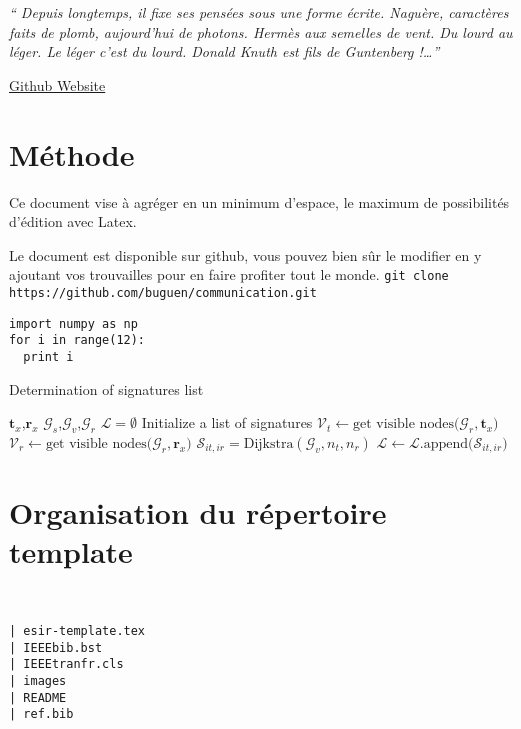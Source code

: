 \documentclass[twocolumn,a4paper]{IEEEtranfr}
\newcommand{\mc}[1]{\mathcal{#1}}
\begin{document}
{\textit
{`` Depuis longtemps, il fixe ses pensées sous une forme écrite.
Naguère, caractères faits de plomb, aujourd'hui de photons. Hermès aux semelles de vent. Du lourd au léger. Le léger c'est du lourd. 
Donald Knuth est fils de Guntenberg !\dots''}

\href{http://www.github.com}{Github Website}
\section{Méthode}

Ce document vise à agréger en un minimum d'espace, le maximum de possibilités
d'édition avec Latex.

Le document est disponible sur github,  vous pouvez bien sûr le modifier en y ajoutant
vos trouvailles pour en faire profiter tout le monde.
{\tt git clone https://github.com/buguen/communication.git}

\begin{lstlisting}
import numpy as np
for i in range(12):
  print i
\end{lstlisting}

\begin{algorithm}               %
\label{alg1}                           %
\caption{Determination of signatures list}
\begin{algorithmic}                    %
\REQUIRE $\mathbf{t}_x$,$\mathbf{r}_x$
\REQUIRE $\mc{G}_s$,$\mc{G}_v$,$\mc{G}_r$
\STATE $\mathcal{L} = \emptyset $ Initialize a list of signatures
\STATE $\mathcal{V}_t \leftarrow \textrm{get visible nodes(}\mc{G}_r,\mathbf{t}_x\textrm{)}$
\STATE $\mathcal{V}_r \leftarrow \textrm{get visible nodes(}\mc{G}_r,\mathbf{r}_x\textrm{)}$
\STATE $\mc{S}_{it,ir}  = \textrm{Dijkstra}(\mc{G}_v,n_t,n_r)$
\STATE $\mathcal{L}\leftarrow \mathcal{L}.\textrm{append(}\mc{S}_{it,ir}\textrm{)}$
\ENDFOR
\ENDFOR
\end{algorithmic}
\end{algorithm}

\section{Organisation du répertoire template}

\begin{verbatim}


| esir-template.tex
| IEEEbib.bst
| IEEEtranfr.cls
| images
| README
| ref.bib


\end{verbatim}}
\end{document}
